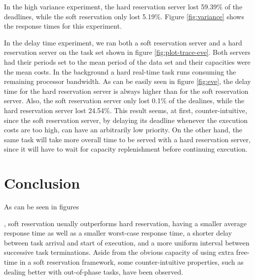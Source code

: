 \documentclass[times, 10pt,twocolumn]{article}
\newcounter{notecounter}
\newcommand{\nota}[1]{\addtocounter{notecounter}{1}{\textcolor{red}{[nota
      \arabic{notecounter}: #1]}}}
\begin{document}
In the high variance experiment, the hard reservation server lost
59.39\% of the deadlines, while the soft reservation only lost
5.19\%. Figure \ref{fig:variance} shows the response times for this
experiment.

\begin{figure*}[t]
  \centering
  \caption{Delay times for the movie trace.}
  \label{fig:eve}
\end{figure*}


In the delay time experiment, we ran both a soft reservation server
and a hard reservation server on the task set shown in figure
\ref{fig:plot-trace-eve}. Both servers had their periods set to the
mean period of the data set and their capacities were the mean
costs. In the background a hard real-time task runs consuming the
remaining processor bandwidth. As can be easily seen in figure
\ref{fig:eve}, the delay time for the hard reservation server is
always higher than for the soft reservation server. Also, the soft
reservation server only lost 0.1\% of the dealines, while the hard
reservation server lost 24.54\%. This result seems, at first,
counter-intuitive, since the soft reservation server, by delaying its
deadline whenever the execution costs are too high, can have an
arbitrarily low priority. On the other hand, the same task will take
more overall time to be served with a hard reservation server, since
it will have to wait for capacity replenishment before continuing
execution.


\section{Conclusion}
\label{sec:conclusion}

As can be seen in figures \nota{colocar as figuras}, soft reservation
usually outperforms hard reservation, having a smaller average
response time as well as a smaller worst-case response time, a shorter
delay between task arrival and start of execution, and a more uniform
interval between successive task terminations. Aside from the obvious
capacity of using extra free-time in a soft reservation framework,
some counter-intuitive properties, such as dealing better with
out-of-phase tasks, have been observed.




\end{document}
